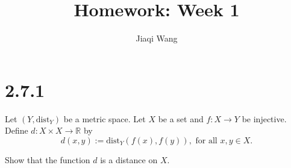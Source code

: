 \documentclass{article}
\title{Homework: Week 1}
\author{Jiaqi Wang}
\theoremstyle{mytheoremstyle}
\theoremstyle{mytheoremstyle}
\theoremstyle{myproblemstyle}
\begin{document}
    \maketitle

    \section{2.7.1}
    \begin{problem}
        Let $(Y, \text{dist}_Y)$ be a metric space. Let $X$ be a set and $f: X \to Y$ be injective. Define $d: X \times X \to \mathbb{R}$ by
        $$d(x,y) := \text{dist}_Y(f(x),f(y)), \text{ for all } x,y \in X.$$

        Show that the function $d$ is a distance on $X$.
    \end{problem}
\end{document}
